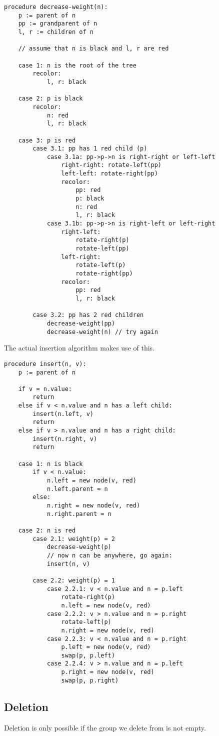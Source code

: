 \documentclass{article}
\begin{document}
\begin{small}
\begin{verbatim}
procedure decrease-weight(n):
    p := parent of n
    pp := grandparent of n
    l, r := children of n

    // assume that n is black and l, r are red

    case 1: n is the root of the tree
        recolor:
            l, r: black

    case 2: p is black
        recolor:
            n: red
            l, r: black

    case 3: p is red
        case 3.1: pp has 1 red child (p)
            case 3.1a: pp->p->n is right-right or left-left
                right-right: rotate-left(pp)
                left-left: rotate-right(pp)
                recolor:
                    pp: red
                    p: black
                    n: red
                    l, r: black
            case 3.1b: pp->p->n is right-left or left-right
                right-left:
                    rotate-right(p)
                    rotate-left(pp)
                left-right:
                    rotate-left(p)
                    rotate-right(pp)
                recolor:
                    pp: red
                    l, r: black

        case 3.2: pp has 2 red children
            decrease-weight(pp)
            decrease-weight(n) // try again
\end{verbatim}
\end{small}

The actual insertion algorithm makes use of this.

\begin{small}
\begin{verbatim}
procedure insert(n, v):
    p := parent of n

    if v = n.value:
        return
    else if v < n.value and n has a left child:
        insert(n.left, v)
        return
    else if v > n.value and n has a right child:
        insert(n.right, v)
        return

    case 1: n is black
        if v < n.value:
            n.left = new node(v, red)
            n.left.parent = n
        else:
            n.right = new node(v, red)
            n.right.parent = n

    case 2: n is red
        case 2.1: weight(p) = 2
            decrease-weight(p)
            // now n can be anywhere, go again:
            insert(n, v)

        case 2.2: weight(p) = 1
            case 2.2.1: v < n.value and n = p.left
                rotate-right(p)
                n.left = new node(v, red)
            case 2.2.2: v > n.value and n = p.right
                rotate-left(p)
                n.right = new node(v, red)
            case 2.2.3: v < n.value and n = p.right
                p.left = new node(v, red)
                swap(p, p.left)
            case 2.2.4: v > n.value and n = p.left
                p.right = new node(v, red)
                swap(p, p.right)
\end{verbatim}
\end{small}

\subsection{Deletion}
Deletion is only possible if the group we delete from is not empty.
\end{document}
